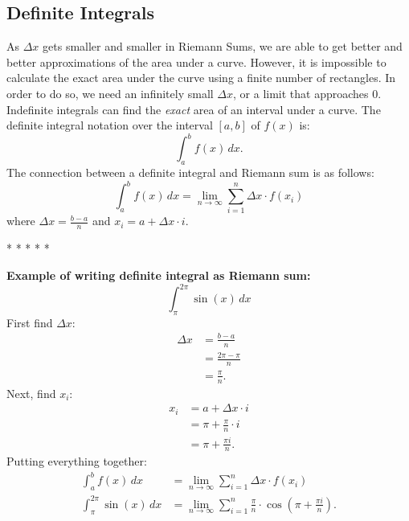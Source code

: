 \documentclass[12pt]{article}
\begin{document}
        \subsection{Definite Integrals} %
            As $\Delta x$ gets smaller and smaller in Riemann Sums, we are able to get better and better approximations of the area under a curve. However, it is impossible to calculate the exact area under the curve using a finite number of rectangles. In order to do so, we need an infinitely small $\Delta x$, or a limit that approaches $0$.
            \\ Indefinite integrals can find the \textit{exact} area of an interval under a curve.
            \newline \newline
            The definite integral notation over the interval $[a, b]$ of $f(x)$ is:
            \[ \int_{a}^{b} f(x) \, dx. \]
            The connection between a definite integral and Riemann sum is as follows:
            \[ \int_{a}^{b} f(x) \, dx = \lim_{n \to \infty} \sum_{i=1}^{n} \Delta x \cdot f(x_i) \]
            where $\Delta x = \frac{b-a}{n}$ and $x_i = a + \Delta x \cdot i$.
            \begin{center}
                * * * * *
            \end{center}
            \textbf{Example of writing definite integral as Riemann sum:}
            \[ \int_{\pi}^{2 \pi} \sin{(x)} \, dx \]
            First find $\Delta x$:
            \begin{align*}
                \Delta x &= \frac{b-a}{n} \\[6pt]
                &= \frac{2 \pi - \pi}{n} \\[6pt]
                &= \frac{\pi}{n}.
            \end{align*}
            Next, find $x_i$:
            \begin{align*}
                x_i &= a + \Delta x \cdot i \\
                &= \pi + \frac{\pi}{n} \cdot i \\[6pt]
                &= \pi + \frac{\pi i}{n}.
            \end{align*}
            Putting everything together:
            \begin{align*}
                \int_{a}^{b} f(x) \, dx &= \lim_{n \to \infty} \sum_{i=1}^{n} \Delta x \cdot f(x_i) \\[6pt]
                \int_{\pi}^{2 \pi} \sin{(x)} \, dx &= \lim_{n \to \infty} \sum_{i=1}^{n} \frac{\pi}{n} \cdot \cos{\left( \pi + \frac{\pi i}{n} \right)}.
            \end{align*}
\end{document}
